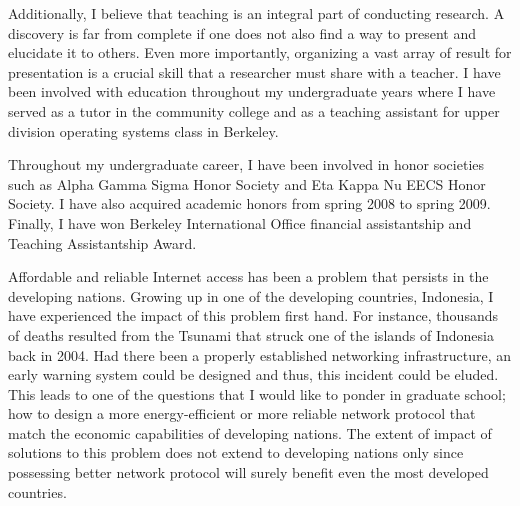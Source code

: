 \documentclass[11pt]{article}
\begin{document}

Additionally, I believe that teaching is an integral part of conducting research. A discovery is far from complete if one does not also find a way to present and elucidate it to others. Even more importantly, organizing a vast array of result for presentation is a crucial skill that a researcher must share with a teacher. I have been involved with education throughout my undergraduate years where I have served as a tutor in the community college and as a teaching assistant for upper division operating systems class in Berkeley. \newline

Throughout my undergraduate career, I have been involved in honor societies such as Alpha Gamma Sigma Honor Society and Eta Kappa Nu EECS Honor Society. I have also acquired academic honors from spring 2008 to spring 2009. Finally, I have won Berkeley International Office financial assistantship and Teaching Assistantship Award. \newline

Affordable and reliable Internet access has been a problem that persists in the developing nations. Growing up in one of the developing countries, Indonesia, I have experienced the impact of this problem first hand. For instance, thousands of deaths resulted from the Tsunami that struck one of the islands of Indonesia back in 2004. Had there been a properly established networking infrastructure, an early warning system could be designed and thus, this incident could be eluded. This leads to one of the questions that I would like to ponder in graduate school; how to design a more energy-efficient or more reliable network protocol that match the economic capabilities of developing nations. The extent of impact of solutions to this problem does not extend to developing nations only since possessing better network protocol will surely benefit even the most developed countries. \newline
\end{document}
